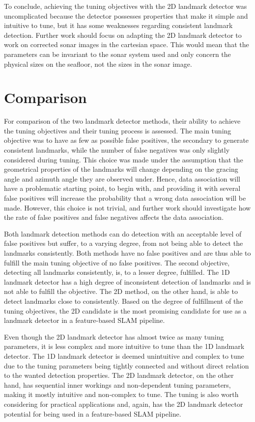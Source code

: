 To conclude, achieving the tuning objectives with the 2D landmark detector was uncomplicated because the detector possesses properties that make it simple and intuitive to tune, but it has some weaknesses regarding consistent landmark detection. Further work should focus on adapting the 2D landmark detector to work on corrected sonar images in the cartesian space. This would mean that the parameters can be invariant to the sonar system used and only concern the physical sizes on the seafloor, not the sizes in the sonar image. 

\section{Comparison}

For comparison of the two landmark detector methods, their ability to achieve the tuning objectives and their tuning process is assessed. The main tuning objective was to have as few as possible false positives, the secondary to generate consistent landmarks, while the number of false negatives was only slightly considered during tuning. This choice was made under the assumption that the geometrical properties of the landmarks will change depending on the gracing angle and azimuth angle they are observed under. Hence, data association will have a problematic starting point, to begin with, and providing it with several false positives will increase the probability that a wrong data association will be made. However, this choice is not trivial, and further work should investigate how the rate of false positives and false negatives affects the data association.

Both landmark detection methods can do detection with an acceptable level of false positives but suffer, to a varying degree, from not being able to detect the landmarks consistently. Both methods have no false positives and are thus able to fulfill the main tuning objective of no false positives. The second objective, detecting all landmarks consistently, is, to a lesser degree, fulfilled. The 1D landmark detector has a high degree of inconsistent detection of landmarks and is not able to fulfill the objective. The 2D method, on the other hand, is able to detect landmarks close to consistently. Based on the degree of fulfillment of the tuning objectives, the 2D candidate is the most promising candidate for use as a landmark detector in a feature-based SLAM pipeline. 

Even though the 2D landmark detector has almost twice as many tuning parameters, it is less complex and more intuitive to tune than the 1D landmark detector. The 1D landmark detector is deemed unintuitive and complex to tune due to the tuning parameters being tightly connected and without direct relation to the wanted detection properties. The 2D landmark detector, on the other hand, has sequential inner workings and non-dependent tuning parameters, making it mostly intuitive and non-complex to tune. The tuning is also worth considering for practical applications and, again, has the 2D landmark detector potential for being used in a feature-based SLAM pipeline. 

